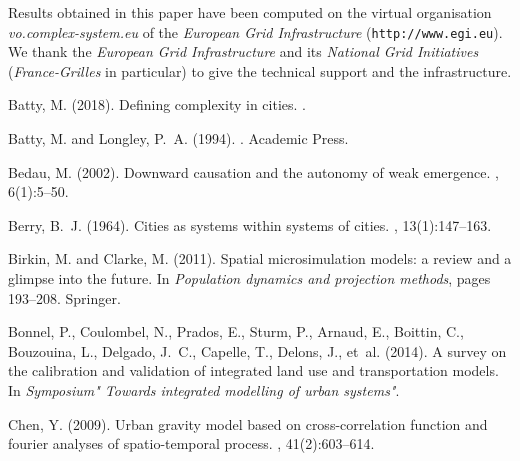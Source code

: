 \documentclass[11pt]{article}
\begin{document}
Results obtained in this paper have been computed on the virtual organisation \textit{vo.complex-system.eu} of the \textit{European Grid Infrastructure} (\texttt{http://www.egi.eu}). We thank the \textit{European Grid Infrastructure} and its \textit{National Grid Initiatives} (\textit{France-Grilles} in particular) to give the technical support and the infrastructure.








\begin{thebibliography}{}

Batty, M. (2018).
\newblock Defining complexity in cities.
.

Batty, M. and Longley, P.~A. (1994).
.
\newblock Academic Press.

Bedau, M. (2002).
\newblock Downward causation and the autonomy of weak emergence.
,
  6(1):5--50.

Berry, B.~J. (1964).
\newblock Cities as systems within systems of cities.
, 13(1):147--163.

Birkin, M. and Clarke, M. (2011).
\newblock Spatial microsimulation models: a review and a glimpse into the
  future.
\newblock In {\em Population dynamics and projection methods}, pages 193--208.
  Springer.

Bonnel, P., Coulombel, N., Prados, E., Sturm, P., Arnaud, E., Boittin, C.,
  Bouzouina, L., Delgado, J.~C., Capelle, T., Delons, J., et~al. (2014).
\newblock A survey on the calibration and validation of integrated land use and
  transportation models.
\newblock In {\em Symposium" Towards integrated modelling of urban systems"}.

Chen, Y. (2009).
\newblock Urban gravity model based on cross-correlation function and fourier
  analyses of spatio-temporal process.
, 41(2):603--614.


\end{thebibliography}
\end{document}
